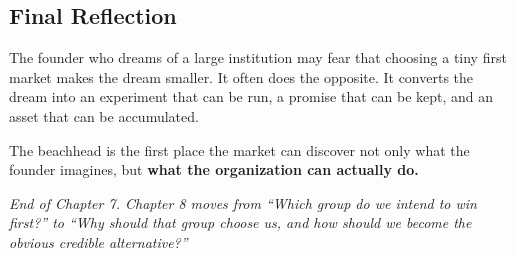 \subsection*{Final Reflection}

The founder who dreams of a large institution may fear that choosing a tiny first market makes the dream smaller. It often does the opposite. It converts the dream into an experiment that can be run, a promise that can be kept, and an asset that can be accumulated.

The beachhead is the first place the market can discover not only what the founder imagines, but \textbf{what the organization can actually do.}

\vspace{1.5ex}
\noindent\emph{End of Chapter 7. Chapter 8 moves from ``Which group do we intend to win first?'' to ``Why should that group choose us, and how should we become the obvious credible alternative?''}
